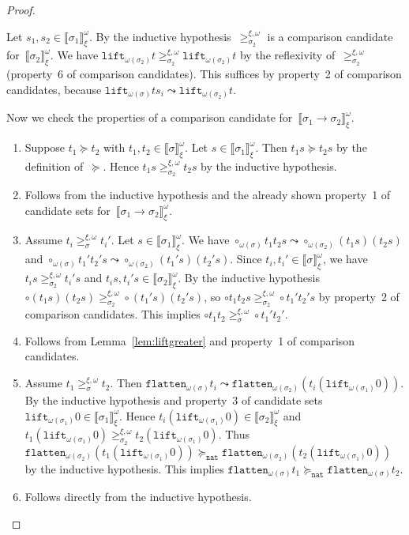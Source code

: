 \documentclass[runningheads,a4paper]{llncs}
\newcommand{\arrtype}{\rightarrow}
\newcommand{\nat}{\mathtt{nat}}
\newcommand{\flatten}{\mathtt{flatten}}
\newcommand{\lift}{\mathtt{lift}}
\newcommand{\val}[3]{\ensuremath{\llbracket#1\rrbracket_{#2}^{#3}}}
\newcommand{\gteq}[3]{\ensuremath{\ge_{#1}^{#2,#3}}}
\begin{document}
\begin{proof}
\begin{enumerate}
    Let $s_1,s_2 \in \val{\sigma_1}{\xi}{\omega}$. By the inductive
    hypothesis~$\gteq{\sigma_2}{\xi}{\omega}$ is a comparison
    candidate for~$\val{\sigma_2}{\xi}{\omega}$. We have
    $\lift_{\omega(\sigma_2)} t \gteq{\sigma_2}{\xi}{\omega}
    \lift_{\omega(\sigma_2)} t$ by the reflexivity
    of~$\gteq{\sigma_2}{\xi}{\omega}$ (property~6 of comparison
    candidates). This suffices by property~2 of comparison candidates,
    because $\lift_{\omega(\sigma)}t s_i \leadsto
    \lift_{\omega(\sigma_2)} t$.
  \end{enumerate}
  Now we check the properties of a comparison candidate
  for~$\val{\sigma_1\arrtype\sigma_2}{\xi}{\omega}$.
  \begin{enumerate}
  \item Suppose $t_1 \succeq t_2$ with $t_1,t_2 \in
    \val{\sigma}{\xi}{\omega}$. Let $s \in
    \val{\sigma_1}{\xi}{\omega}$. Then $t_1 s \succeq t_2 s$ by the
    definition of~$\succeq$. Hence $t_1 s \gteq{\sigma_2}{\xi}{\omega}
    t_2 s$ by the inductive hypothesis.
  \item Follows from the inductive hypothesis and the already shown
    property~1 of candidate sets
    for~$\val{\sigma_1\arrtype\sigma_2}{\xi}{\omega}$.
  \item Assume $t_i \gteq{\sigma}{\xi}{\omega} t_i'$. Let $s \in
    \val{\sigma_1}{\xi}{\omega}$. We have $\circ_{\omega(\sigma)} t_1
    t_2 s \leadsto \circ_{\omega(\sigma_2)} (t_1 s) (t_2 s)$ and
    $\circ_{\omega(\sigma)} t_1' t_2' s \leadsto
    \circ_{\omega(\sigma_2)} (t_1' s) (t_2' s)$. Since
    $t_i,t_i'\in\val{\sigma}{\xi}{\omega}$, we have $t_i s
    \gteq{\sigma_2}{\xi}{\omega} t_i' s$ and $t_i s, t_i' s \in
    \val{\sigma_2}{\xi}{\omega}$. By the inductive hypothesis $\circ
    (t_1 s) (t_2 s) \gteq{\sigma_2}{\xi}{\omega} \circ (t_1' s) (t_2'
    s)$, so $\circ t_1 t_2 s \gteq{\sigma_2}{\xi}{\omega} \circ t_1'
    t_2' s$ by property~2 of comparison candidates. This implies
    $\circ t_1 t_2 \gteq{\sigma}{\xi}{\omega} \circ t_1' t_2'$.
  \item Follows from Lemma~\ref{lem:liftgreater} and property~1 of
    comparison candidates.
  \item Assume $t_1 \gteq{\sigma}{\xi}{\omega} t_2$. Then
    $\flatten_{\omega(\sigma)} t_i \leadsto
    \flatten_{\omega(\sigma_2)} (t_i (\lift_{\omega(\sigma_1)}0))$. By
    the inductive hypothesis and property~3 of candidate sets
    $\lift_{\omega(\sigma_1)}0 \in \val{\sigma_1}{\xi}{\omega}$. Hence
    $t_i (\lift_{\omega(\sigma_1)}0) \in \val{\sigma_2}{\xi}{\omega}$
    and $t_1 (\lift_{\omega(\sigma_1)}0) \gteq{\sigma_2}{\xi}{\omega}
    t_2 (\lift_{\omega(\sigma_1)}0)$. Thus
    $\flatten_{\omega(\sigma_2)} (t_1 (\lift_{\omega(\sigma_1)}0))
    \succeq_\nat \flatten_{\omega(\sigma_2)} (t_2
    (\lift_{\omega(\sigma_1)}0))$ by the inductive hypothesis. This
    implies $\flatten_{\omega(\sigma)} t_1 \succeq_\nat
    \flatten_{\omega(\sigma)} t_2$.
  \item Follows directly from the inductive hypothesis.
  \end{enumerate}


\end{proof}
\end{document}
